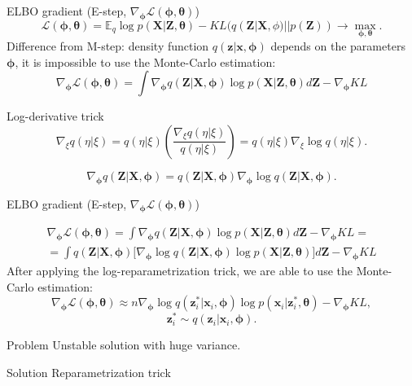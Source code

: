 \documentclass{beamer}
\newcommand{\bx}{\mathbf{x}}
\newcommand{\bz}{\mathbf{z}}
\newcommand{\bX}{\mathbf{X}}
\newcommand{\bZ}{\mathbf{Z}}
\newcommand{\bphi}{\boldsymbol{\phi}}
\newcommand{\btheta}{\boldsymbol{\theta}}
\begin{document}
\begin{frame}{ELBO gradient (E-step, $\nabla_{\bphi} \mathcal{L}(\bphi, \btheta)$)}
\vspace{-0.3cm}
\[
	\mathcal{L} (\bphi, \btheta)  = \mathbb{E}_{q} \log p(\bX | \bZ, \btheta) - KL (q(\bZ| \bX, \phi) || p(\bZ)) \rightarrow \max_{\bphi, \btheta}.
\]
	Difference from M-step: density function $q(\bz| \bx, \bphi)$ depends on the parameters $\bphi$, it is impossible to use the Monte-Carlo estimation:
	\[
		\nabla_{\bphi} \mathcal{L} (\bphi, \btheta) = \int \nabla_{\bphi} q(\bZ| \bX, \bphi) \log p(\bX |\bZ, \btheta) d\bZ - \nabla_{\bphi} KL
	\]
	
	\begin{block}{Log-derivative trick}
	    \[
	    \nabla_\xi q(\eta| \xi) = q(\eta | \xi) \left( \frac{\nabla_\xi q(\eta | \xi)}{q(\eta| \xi)} \right) = q(\eta | \xi) \nabla_\xi \log q(\eta| \xi).
	    \]
	\end{block}
	\[
		\nabla_{\bphi} q(\bZ| \bX, \bphi) = q(\bZ| \bX, \bphi) \nabla_{\bphi} \log q(\bZ| \bX, \bphi).
	\]
\end{frame}
\begin{frame}{ELBO gradient (E-step, $\nabla_{\bphi} \mathcal{L}(\bphi, \btheta)$)}

	\begin{multline*}
		\nabla_{\bphi} \mathcal{L} (\bphi, \btheta) = \int \nabla_{\bphi} q(\bZ| \bX, \bphi) \log p(\bX |\bZ, \btheta) d\bZ  - \nabla_{\bphi} KL = \\ 
		=  \int q(\bZ| \bX, \bphi) \bigl[  \nabla_{\bphi} \log q(\bZ| \bX, \bphi) \log p(\bX |\bZ, \btheta) \bigr] d\bZ - \nabla_{\bphi} KL
	\end{multline*}
	After applying the log-reparametrization trick, we are able to use the Monte-Carlo estimation:
	\[
		\nabla_{\bphi} \mathcal{L} (\bphi, \btheta) \approx n \nabla_{\bphi} \log q(\bz_i^*| \bx_i, \bphi) \log p(\bx_i |\bz_i^*, \btheta) - \nabla_{\bphi} KL,
	\]
	\[
		\bz_i^* \sim q(\bz_i| \bx_i, \bphi).
	\]
	\vspace{-0.2cm}
	\begin{block}{Problem} 
	Unstable solution with huge variance.
	\end{block}
	\begin{block}{Solution}
	    Reparametrization trick
	\end{block}
\end{frame}
\end{document}
